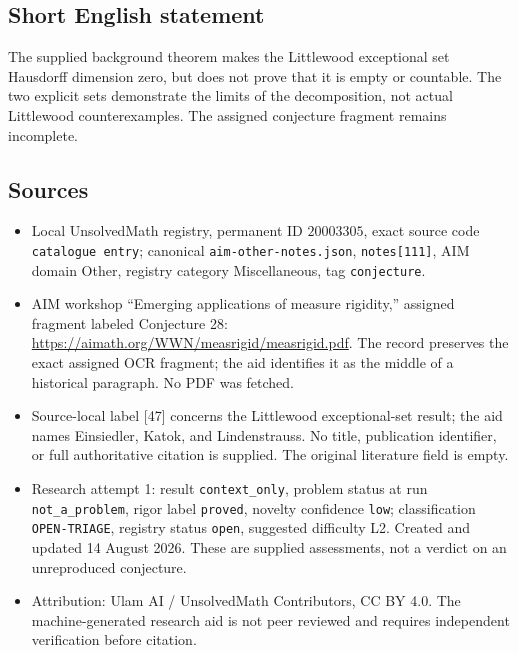 \documentclass[11pt]{article}
\begin{document}
\subsection{Short English statement}
The supplied background theorem makes the Littlewood exceptional set Hausdorff dimension zero, but does not prove that it is empty or countable. The two explicit sets demonstrate the limits of the decomposition, not actual Littlewood counterexamples. The assigned conjecture fragment remains incomplete.
\subsection{Sources}
\begin{itemize}
\item Local UnsolvedMath registry, permanent ID \(20003305\), exact source code \texttt{catalogue entry}; canonical \texttt{aim-other-notes.json}, \texttt{notes[111]}, AIM domain Other, registry category Miscellaneous, tag \texttt{conjecture}.
\item AIM workshop ``Emerging applications of measure rigidity,'' assigned fragment labeled Conjecture 28: \url{https://aimath.org/WWN/measrigid/measrigid.pdf}. The record preserves the exact assigned OCR fragment; the aid identifies it as the middle of a historical paragraph. No PDF was fetched.
\item Source-local label [47] concerns the Littlewood exceptional-set result; the aid names Einsiedler, Katok, and Lindenstrauss. No title, publication identifier, or full authoritative citation is supplied. The original literature field is empty.
\item Research attempt 1: result \texttt{context\_only}, problem status at run \texttt{not\_a\_problem}, rigor label \texttt{proved}, novelty confidence \texttt{low}; classification \texttt{OPEN-TRIAGE}, registry status \texttt{open}, suggested difficulty L2. Created and updated 14 August 2026. These are supplied assessments, not a verdict on an unreproduced conjecture.
\item Attribution: Ulam AI / UnsolvedMath Contributors, CC BY 4.0. The machine-generated research aid is not peer reviewed and requires independent verification before citation.
\end{itemize}
\end{document}
